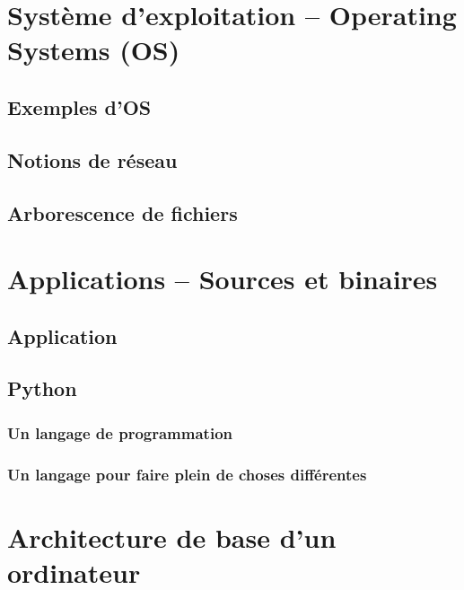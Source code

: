 \section{Système d'exploitation -- Operating Systems (OS)}
\subsection{Exemples d'OS}
\subsection{Notions de réseau}
\subsection{Arborescence de fichiers}
\section{Applications -- Sources et binaires}
\subsection{Application}

\subsection{Python}
\subsubsection{Un langage de programmation}

\subsubsection{Un langage pour faire plein de choses différentes}

\newpage
\section{Architecture de base d'un ordinateur}

